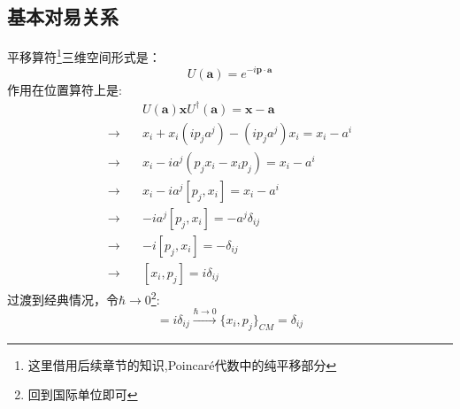 \subsection{基本对易关系}
    平移算符\footnote{这里借用后续章节的知识,Poincar\'e代数中的纯平移部分}三维空间形式是：
\begin{equation}
    U(\boldsymbol{a})=e^{-i\boldsymbol{p}\cdot\boldsymbol{a}}
\end{equation}
    作用在位置算符上是:
\begin{equation}
    \begin{aligned}
        &U(\boldsymbol{a})\boldsymbol{x}U^\dagger(\boldsymbol{a})=\boldsymbol{x}-\boldsymbol{a}\\
        \to\quad& x_i + x_i\left(ip_j a^j\right) - \left(ip_j a^j\right)x_i = x_i - a^i \\
        \to\quad& x_i - i a^j (p_j x_i - x_i p_j) = x_i - a^i \\
        \to\quad& x_i - i a^j [p_j, x_i] = x_i - a^i \\
        \to\quad& -i a^j [p_j, x_i] = -a^j\delta_{ij} \\
        \to\quad& -i [p_j, x_i] = -\delta_{ij} \\
        \to\quad& [ x_i,p_j] = i \delta_{ij}
    \end{aligned}
\end{equation}
过渡到经典情况，令$\hbar\to0$\footnote{回到国际单位即可}:\begin{equation}
    [ x_i,p_j] = i \delta_{ij}\overset{\hbar\to0}{\longrightarrow}\{ x_i,p_j\}_{CM}=\delta_{ij}
\end{equation}
